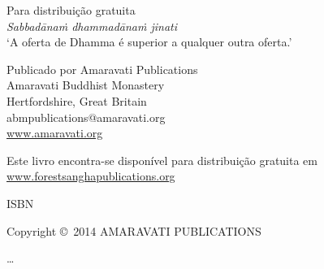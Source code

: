 \cleartoverso

\thispagestyle{empty}

{\small\setlength{\parskip}{0.8em}\setlength{\parindent}{0em}%
{\raggedright%

\thetitle

Para distribuição gratuita\\
\emph{Sabbadānaṁ dhammadānaṁ jinati}\\
‘A oferta de Dhamma é superior a qualquer outra oferta.’

Publicado por Amaravati Publications\\
Amaravati Buddhist Monastery\\
Hertfordshire, Great Britain\\
abmpublications@amaravati.org\\
\href{http://amaravati.org}{www.amaravati.org}

Este livro encontra-se disponível para distribuição gratuita em\\
\href{http://forestsanghapublications.org/}{www.forestsanghapublications.org}

ISBN \theISBN

Copyright \copyright\ 2014 AMARAVATI PUBLICATIONS

\ldots

%
%
%
%

}}


